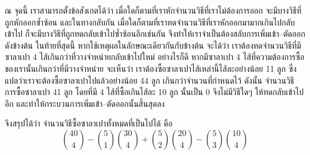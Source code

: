 \documentclass[a4paper,12pt,twoside]{article}
\begin{document}
\begin{example}
ณ จุดนี้ เราสามารถตั้งข้อสังเกตได้ว่า เมื่อใดก็ตามที่เราหักจำนวนวิธีที่เราไม่ต้องการออก จะมีบางวิธีที่ถูกหักออกซ้ำซ้อน และในทางกลับกัน เมื่อใดก็ตามที่เราทดจำนวนวิธีที่เราหักออกมามากเกินไปกลับเข้าไป ก็จะมีบางวิธีที่ถูกทดกลับเข้าไปซ้ำซ้อนอีกเช่นกัน จึงทำให้เราจำเป็นต้องสลับการเพิ่มเข้า--ตัดออกดังข้างต้น \enskip ในท้ายที่สุดนี้ หากใช้เหตุผลในลักษณะเดียวกันกับข้างต้น จะได้ว่า เราต้องทดจำนวนวิธีที่มีซาลาเปา 4 ไส้เกินกว่าที่วางจำหน่ายกลับเข้าไปใหม่ \enskip อย่างไรก็ดี หากมีซาลาเปา 4 ไส้ที่ความต้องการซื้อของเรานั้นเกินกว่าที่มีวางจำหน่าย จะเห็นว่า เราต้องซื้อซาลาเปาไส้เหล่านี้ไส้ละอย่างน้อย 11 ลูก ซึ่งแปลว่าเราจะต้องซื้อซาลาเปาไปแล้วอย่างน้อย 44 ลูก เกินกว่าจำนวนที่กำหนดไว้ \enskip ดังนั้น จำนวนวิธีการซื้อซาลาเปา 41 ลูก โดยที่มี 4 ไส้ที่ซื้อเกินไส้ละ 10 ลูก นั้นเป็น 0 จึงไม่มีวิธีใดๆ ให้ทดกลับเข้าไปอีก และทำให้กระบวนการเพิ่มเข้า--ตัดออกนั้นสิ้นสุดลง

จึงสรุปได้ว่า จำนวนวิธีซื้อซาลาเปาทั้งหมดที่เป็นไปได้ คือ
\[\binom{40}{4}-\binom{5}{1}\binom{30}{4}+\binom{5}{2}\binom{20}{4}-\binom{5}{3}\binom{10}{4}\]
\end{example}
\end{document}
